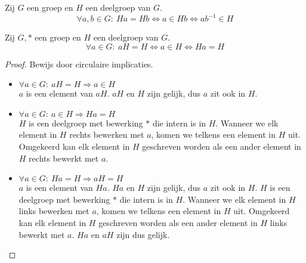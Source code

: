 \documentclass[main.tex]{subfiles}
\begin{document}
\begin{ei}
  \label{ei:rechter-nevenklasse-eig}
  Zij $G$ een groep en $H$ een deelgroep van $G$.
  \[ \forall a,b \in G:\ Ha = Hb \Leftrightarrow a \in Hb \Leftrightarrow ab^{-1} \in H \]
\end{ei}

\begin{ei}
  \label{ei:nevenklasse-eigen-element-gelijk}
  Zij $G,*$ een groep en $H$ een deelgroep van $G$.
  \[ \forall a \in G:\ aH = H \Leftrightarrow a \in H \Leftrightarrow Ha = H \]

  \begin{proof}
    Bewijs door circulaire implicaties.
    \begin{itemize}
    \item $\forall a \in G:\ aH = H \Rightarrow a \in H$\\
      $a$ is een element van $aH$. $aH$ en $H$ zijn gelijk, dus $a$ zit ook in $H$.
    \item $\forall a \in G:\ a \in H \Rightarrow Ha = H$\\
      $H$ is een deelgroep met bewerking $*$ die intern is in $H$.
      Wanneer we elk element in $H$ rechts bewerken met $a$, komen we telkens een element in $H$ uit.
      Omgekeerd kan elk element in $H$ geschreven worden als een ander element in $H$ rechts bewerkt met $a$.
    \item $\forall a \in G:\ Ha = H \Rightarrow aH = H$\\
      $a$ is een element van $Ha$. $Ha$ en $H$ zijn gelijk, dus $a$ zit ook in $H$.
      $H$ is een deelgroep met bewerking $*$ die intern is in $H$.
      Wanneer we elk element in $H$ links bewerken met $a$, komen we telkens een element in $H$ uit.
      Omgekeerd kan elk element in $H$ geschreven worden als een ander element in $H$ links bewerkt met $a$.
      $Ha$ en $aH$ zijn dus gelijk.
    \end{itemize}
  \end{proof}
\end{ei}
\end{document}
